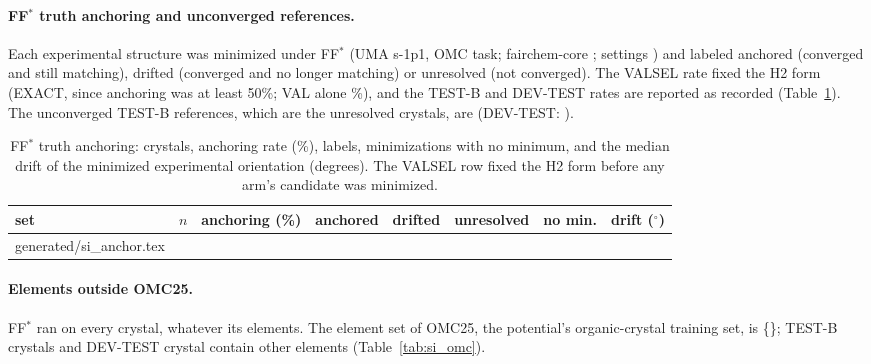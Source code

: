 \documentclass[journal=acsodf,manuscript=article]{achemso}
\makeatletter
\newcommand{\inputrows}[1]{\@@input #1 }
\makeatother
\begin{document}
\paragraph{FF$^\ast$ truth anchoring and unconverged references.} Each experimental structure was
minimized under FF$^\ast$ (UMA s-1p1\cite{wood2025uma}, OMC task; fairchem-core
\svFairchem\cite{fairchem2026core}; settings \svFFSettings) and labeled anchored (converged and still matching), drifted (converged and no
longer matching) or unresolved (not converged). The VALSEL rate fixed the H2 form (EXACT, since
anchoring was at least 50\%; VAL alone \svAnchValOnly\%), and the TEST-B and DEV-TEST rates are
reported as recorded (Table~\ref{tab:si_anchor}). The unconverged TEST-B references, which are
the unresolved crystals, are \svBasinUnconv{} (DEV-TEST: \svBasinUnconvDev).

\begin{table}[htbp]
\caption{FF$^\ast$ truth anchoring: crystals, anchoring rate (\%), labels, minimizations with no
minimum, and the median drift of the minimized experimental orientation (degrees). The VALSEL row
fixed the H2 form before any arm's candidate was minimized.}
\label{tab:si_anchor}
\centering
\footnotesize
\begin{tabular}{@{}p{3.2cm}rcrrrrc@{}}
\toprule
set & $n$ & anchoring (\%) & anchored & drifted & unresolved & no min. & drift ($^\circ$) \\
\midrule
\inputrows{generated/si_anchor.tex}
\bottomrule
\end{tabular}
\end{table}

\paragraph{Elements outside OMC25.} FF$^\ast$ ran on every crystal, whatever its elements. The
element set of OMC25\cite{gharakhanyan2026omc25}, the potential's organic-crystal training set, is \{\svOmcElements\};
\svOmcOutside{} TEST-B crystals and \svOmcOutsideDev{} DEV-TEST crystal contain other elements
(Table~\ref{tab:si_omc}).
\end{document}
